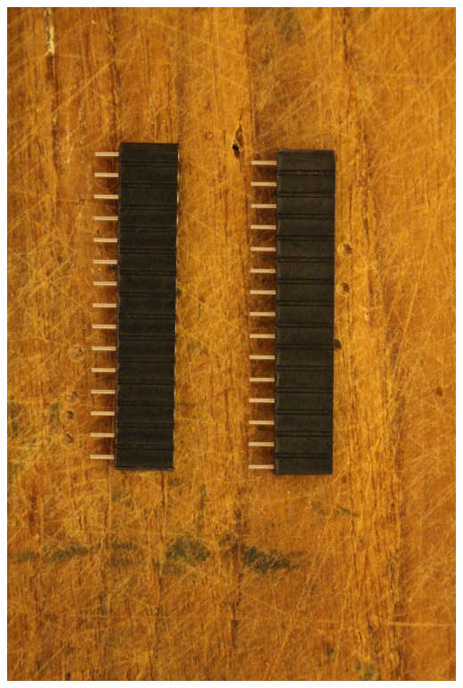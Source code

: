 \documentclass{article}
\begin{document}
\vspace{1cm}

\begin{minipage}[b]{0.5\textwidth}
	\includegraphics[width=\textwidth]{Bilder2019/IMG_6454.JPG}
\end{minipage}
\end{document}
